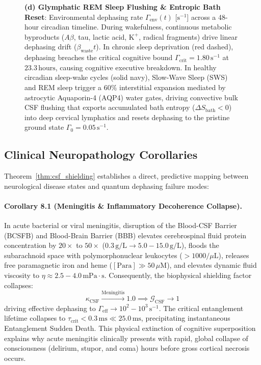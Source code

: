 \documentclass[10pt,twocolumn,3p]{article}
\begin{document}
\begin{figure}[t!]
{    \textbf{(d) Glymphatic REM Sleep Flushing \& Entropic Bath Reset}: Environmental dephasing rate $\Gamma_{\text{env}}(t)$ [$\text{s}^{-1}$] across a 48-hour circadian timeline. During wakefulness, continuous metabolic byproducts ($A\beta$, tau, lactic acid, $\text{K}^+$, radical fragments) drive linear dephasing drift ($\beta_{\text{waste}} t$). In chronic sleep deprivation (red dashed), dephasing breaches the critical cognitive bound $\Gamma_{\text{crit}} = 1.80\,\text{s}^{-1}$ at $23.3\,\text{hours}$, causing cognitive executive breakdown. In healthy circadian sleep-wake cycles (solid navy), Slow-Wave Sleep (SWS) and REM sleep trigger a $60\%$ interstitial expansion mediated by astrocytic Aquaporin-4 (AQP4) water gates, driving convective bulk CSF flushing that exports accumulated bath entropy ($\Delta S_{\text{bath}} < 0$) into deep cervical lymphatics and resets dephasing to the pristine ground state $\Gamma_0 = 0.05\,\text{s}^{-1}$.}
    \label{fig:csf_biophysical_shielding}
\end{figure}

\subsection{Clinical Neuropathology Corollaries}
\label{subsec:csf_clinical_corollaries}

Theorem~\ref{thm:csf_shielding} establishes a direct, predictive mapping between neurological disease states and quantum dephasing failure modes:

\paragraph{Corollary 8.1 (Meningitis \& Inflammatory Decoherence Collapse).}
\label{cor:meningitis}
In acute bacterial or viral meningitis, disruption of the Blood-CSF Barrier (BCSFB) and Blood-Brain Barrier (BBB) elevates cerebrospinal fluid protein concentration by $20\times$ to $50\times$ ($0.3\,\text{g/L} \to 5.0 - 15.0\,\text{g/L}$), floods the subarachnoid space with polymorphonuclear leukocytes ($> 1000/\mu\text{L}$), releases free paramagnetic iron and heme ($[\text{Para}] \gg 50\,\mu\text{M}$), and elevates dynamic fluid viscosity to $\eta \approx 2.5 - 4.0\,\text{mPa}\cdot\text{s}$. Consequently, the biophysical shielding factor collapses:
\begin{equation}
    \kappa_{\text{CSF}} \xrightarrow{\text{Meningitis}} 1.0 \implies \mathcal{G}_{\text{CSF}} \to 1
\end{equation}
driving effective dephasing to $\Gamma_{\text{eff}} \to 10^2 - 10^3\,\text{s}^{-1}$. The critical entanglement lifetime collapses to $\tau_{\text{crit}} < 0.3\,\text{ms} \ll 25.0\,\text{ms}$, precipitating instantaneous Entanglement Sudden Death. This physical extinction of cognitive superposition explains why acute meningitis clinically presents with rapid, global collapse of consciousness (delirium, stupor, and coma) hours before gross cortical necrosis occurs.
\end{document}

